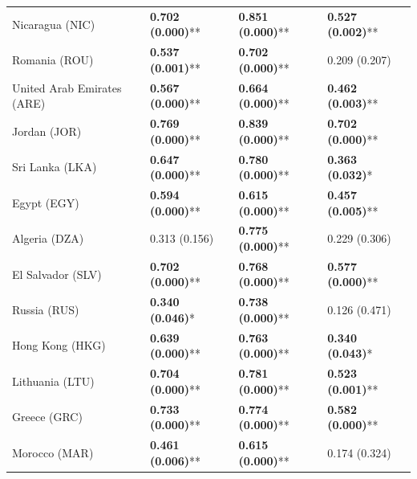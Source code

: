 \begin{longtable}{p{5cm}p{3cm}p{3cm}p{5cm}}
Nicaragua (NIC) & \textcolor{atlLime600}{\textbf{0.702 (0.000)}**} & \textcolor{atlLime600}{\textbf{0.851 (0.000)}**} & \textcolor{atlLime600}{\textbf{0.527 (0.002)}**} \\
Romania (ROU) & \textcolor{atlLime600}{\textbf{0.537 (0.001)}**} & \textcolor{atlLime600}{\textbf{0.702 (0.000)}**} & \textcolor{atlOrange600}{0.209 (0.207)} \\
United Arab Emirates (ARE) & \textcolor{atlLime600}{\textbf{0.567 (0.000)}**} & \textcolor{atlLime600}{\textbf{0.664 (0.000)}**} & \textcolor{atlLime600}{\textbf{0.462 (0.003)}**} \\
Jordan (JOR) & \textcolor{atlLime600}{\textbf{0.769 (0.000)}**} & \textcolor{atlLime600}{\textbf{0.839 (0.000)}**} & \textcolor{atlLime600}{\textbf{0.702 (0.000)}**} \\
Sri Lanka (LKA) & \textcolor{atlLime600}{\textbf{0.647 (0.000)}**} & \textcolor{atlLime600}{\textbf{0.780 (0.000)}**} & \textcolor{atlLime600}{\textbf{0.363 (0.032)}*} \\
Egypt (EGY) & \textcolor{atlLime600}{\textbf{0.594 (0.000)}**} & \textcolor{atlLime600}{\textbf{0.615 (0.000)}**} & \textcolor{atlLime600}{\textbf{0.457 (0.005)}**} \\
Algeria (DZA) & \textcolor{atlOrange600}{0.313 (0.156)} & \textcolor{atlLime600}{\textbf{0.775 (0.000)}**} & \textcolor{atlOrange600}{0.229 (0.306)} \\
El Salvador (SLV) & \textcolor{atlLime600}{\textbf{0.702 (0.000)}**} & \textcolor{atlLime600}{\textbf{0.768 (0.000)}**} & \textcolor{atlLime600}{\textbf{0.577 (0.000)}**} \\
Russia (RUS) & \textcolor{atlLime600}{\textbf{0.340 (0.046)}*} & \textcolor{atlLime600}{\textbf{0.738 (0.000)}**} & \textcolor{atlOrange600}{0.126 (0.471)} \\
Hong Kong (HKG) & \textcolor{atlLime600}{\textbf{0.639 (0.000)}**} & \textcolor{atlLime600}{\textbf{0.763 (0.000)}**} & \textcolor{atlLime600}{\textbf{0.340 (0.043)}*} \\
Lithuania (LTU) & \textcolor{atlLime600}{\textbf{0.704 (0.000)}**} & \textcolor{atlLime600}{\textbf{0.781 (0.000)}**} & \textcolor{atlLime600}{\textbf{0.523 (0.001)}**} \\
Greece (GRC) & \textcolor{atlLime600}{\textbf{0.733 (0.000)}**} & \textcolor{atlLime600}{\textbf{0.774 (0.000)}**} & \textcolor{atlLime600}{\textbf{0.582 (0.000)}**} \\
Morocco (MAR) & \textcolor{atlLime600}{\textbf{0.461 (0.006)}**} & \textcolor{atlLime600}{\textbf{0.615 (0.000)}**} & \textcolor{atlOrange600}{0.174 (0.324)} \\

\end{longtable}
